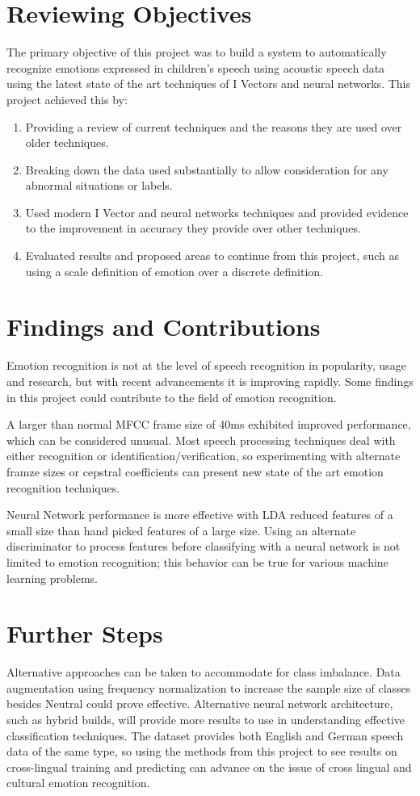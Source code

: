 \section{Reviewing Objectives}
		The primary objective of this project was to build a system to automatically recognize emotions expressed in children's speech using acoustic speech data using the latest state of the art techniques of I Vectors and neural networks. This project achieved this by:
	\begin{enumerate}
		\item Providing a review of current techniques and the reasons they are used over older techniques.
		\item Breaking down the data used substantially to allow consideration for any abnormal situations or labels.
		\item Used modern I Vector and neural networks techniques and provided evidence to the improvement in accuracy they provide over other techniques.
		\item Evaluated results and proposed areas to continue from this project, such as using a scale definition of emotion over a discrete definition.
	\end{enumerate}
\section{Findings and Contributions}
	Emotion recognition is not at the level of speech recognition in popularity, usage and research, but with recent advancements it is improving rapidly. Some findings in this project could contribute to the field of emotion recognition.
	
	A larger than normal MFCC frame size of 40ms exhibited improved performance, which can be considered unusual. Most speech processing techniques deal with either recognition or identification/verification, so experimenting with alternate framze sizes or cepstral coefficients can present new state of the art emotion recognition techniques.
	
	Neural Network performance is more effective with LDA reduced features of a small size than hand picked features of a large size. Using an alternate discriminator to process features before classifying with a neural network is not limited to emotion recognition; this behavior can be true for various machine learning problems.
\section{Further Steps}
	Alternative approaches can be taken to accommodate for class imbalance. Data augmentation using frequency normalization to increase the sample size of classes besides Neutral could prove effective. Alternative neural network architecture, such as hybrid builds, will provide more results to use in understanding effective classification techniques. The dataset provides both English and German speech data of the same type, so using the methods from this project to see results on cross-lingual training and predicting can advance on the issue of cross lingual and cultural emotion recognition.
